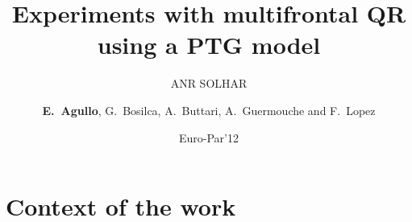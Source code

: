 \documentclass{beamer}
\author{{\bf E.~Agullo}, G.~Bosilca, A.~Buttari, A.~Guermouche and F.~Lopez}
\institute{Universit\'e de Toulouse-IRIT}
\title{Experiments with multifrontal QR using a PTG model}
\subtitle{ANR SOLHAR}
\date{Euro-Par'12}
\begin{document}
\begin{frame}[t,plain]
\titlepage

\end{frame}


\part{Context of the work}


\end{document}
